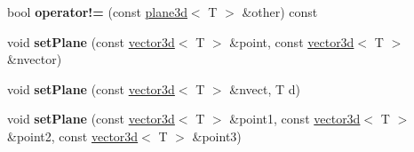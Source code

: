 \begin{DoxyCompactItemize}
\item 
bool {\bfseries operator!=} (const \hyperlink{classirr_1_1core_1_1plane3d}{plane3d}$<$ T $>$ \&other) const \hypertarget{classirr_1_1core_1_1plane3d_a1ef3ad54e652a02f3ea8c97884332f06}{}\label{classirr_1_1core_1_1plane3d_a1ef3ad54e652a02f3ea8c97884332f06}

\item 
void {\bfseries set\+Plane} (const \hyperlink{classirr_1_1core_1_1vector3d}{vector3d}$<$ T $>$ \&point, const \hyperlink{classirr_1_1core_1_1vector3d}{vector3d}$<$ T $>$ \&nvector)\hypertarget{classirr_1_1core_1_1plane3d_a74c75911a10cc048c546ca5ea3646232}{}\label{classirr_1_1core_1_1plane3d_a74c75911a10cc048c546ca5ea3646232}

\item 
void {\bfseries set\+Plane} (const \hyperlink{classirr_1_1core_1_1vector3d}{vector3d}$<$ T $>$ \&nvect, T d)\hypertarget{classirr_1_1core_1_1plane3d_a1f68018de37d6bc904c33192816b899b}{}\label{classirr_1_1core_1_1plane3d_a1f68018de37d6bc904c33192816b899b}

\item 
void {\bfseries set\+Plane} (const \hyperlink{classirr_1_1core_1_1vector3d}{vector3d}$<$ T $>$ \&point1, const \hyperlink{classirr_1_1core_1_1vector3d}{vector3d}$<$ T $>$ \&point2, const \hyperlink{classirr_1_1core_1_1vector3d}{vector3d}$<$ T $>$ \&point3)\hypertarget{classirr_1_1core_1_1plane3d_a32ca1fd89b65630b4d77641005ffa94d}{}\label{classirr_1_1core_1_1plane3d_a32ca1fd89b65630b4d77641005ffa94d}


\end{DoxyCompactItemize}

